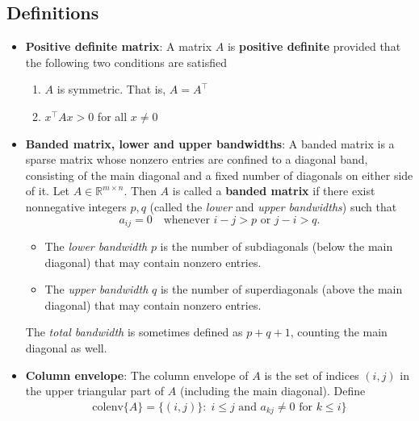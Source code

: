 \documentclass{report}
\begin{document}
    \bigbreak \noindent 
    \subsection{Definitions}
    \begin{itemize}
        \item \textbf{Positive definite matrix}: A matrix $A$ is \textbf{positive definite} provided that the following two conditions are satisfied
            \begin{enumerate}
                \item $A$ is symmetric. That is, $A = A^{\top} $
                \item $x^{\top}Ax > 0 $ for all $x\ne 0$
            \end{enumerate}
        \item \textbf{Banded matrix, lower and upper bandwidths}: A banded matrix is a sparse matrix whose nonzero entries are confined to a diagonal band, consisting of the main diagonal and a fixed number of diagonals on either side of it.
            \bigbreak \noindent 
            Let $A \in \mathbb{R}^{m \times n}$.  
            Then $A$ is called a \textbf{banded matrix} if there exist nonnegative integers $p, q$ (called the \emph{lower} and \emph{upper bandwidths}) such that
            \[
                a_{ij} = 0 \quad \text{whenever } i - j > p \text{ or } j - i > q.
            \]
            \begin{itemize}
                \item The \emph{lower bandwidth} $p$ is the number of subdiagonals (below the main diagonal) that may contain nonzero entries.
                \item The \emph{upper bandwidth} $q$ is the number of superdiagonals (above the main diagonal) that may contain nonzero entries.
            \end{itemize}
            The \emph{total bandwidth} is sometimes defined as $p + q + 1$, counting the main diagonal as well.
        \item \textbf{Column envelope}: The column envelope of $A $ is the set of indices $(i,j)$ in the upper triangular part of $A$ (including the main diagonal). Define
            \begin{align*}
            \text{colenv}\{A\} = \{(i,j)\} :\; i \leq j \text{ and } a_{kj} \ne 0 \text{ for } k \leq i\}
            \end{align*}




    \end{itemize}
\end{document}
